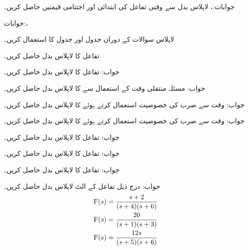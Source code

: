 جوابات:، 
لاپلاس بدل  سے وقتی تفاعل کی ابتدائی اور اختتامی قیمتیں حاصل کریں۔

جوابات:، 


لاپلاس سوالات کے دوران جدول  اور جدول  کا استعمال کریں۔

تفاعل  کا لاپلاس بدل حاصل کریں۔

جواب:
تفاعل  کا لاپلاس بدل حاصل کریں۔

جواب:
مسئلہ منتقلی وقت کے استعمال سے  کا لاپلاس بدل حاصل کریں۔

جواب:
وقت سے ضرب کی خصوصیت استعمال کرتے ہوئے   کا لاپلاس بدل حاصل کریں۔

جواب:
وقت سے ضرب کی خصوصیت استعمال کرتے ہوئے   کا لاپلاس بدل حاصل کریں۔

جواب:
تفاعل  کا لاپلاس بدل حاصل کریں۔

جواب:
تفاعل  کا لاپلاس بدل حاصل کریں۔

جواب:
تفاعل  کا لاپلاس بدل حاصل کریں۔

جواب:
درج ذیل تفاعل کے الٹ لاپلاس بدل حاصل کریں۔
\begin{align*}
{\ensuremath{{\textup{F}}}}(s)&=\frac{s+2}{(s+4)(s+6)}\\
{{\textup{F}}}(s)&=\frac{20}{(s+1)(s+3)}\\
{{\textup{F}}}(s)&=\frac{12s}{(s+5)(s+6)}
\end{align*}

